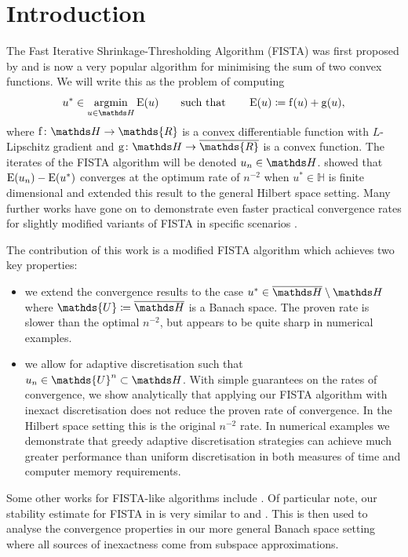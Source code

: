 \documentclass[10pt,a4paper,onecolumn]{article}
\numberwithin{equation}{section}
\let\F\mathds\let\C\mathcal\newcommand{\R}{\F{R}}\newcommand{\A}{\C{A}}
\newcommand{\op}[1]{\operatorname{#1}}\newcommand{\overtext}[2]{\stackrel{\text{#1}}{#2}}
\renewcommand{\bar}{\overline}\renewcommand{\hat}{\widehat}\renewcommand{\tilde}{\widetilde}
\DeclareMathOperator*{\argmin}{argmin}\DeclareMathOperator{\TV}{TV}
\newcommand*{\Func}[1]{%
	\IfEqCase{#1}{%
		{0}{\op{E}}%
		{1}{\op{F}}%
		{2}{\op{G}}%
		{3}{\op{H}}%
	}[\op{F}#1]%
}
\newcommand*{\func}[1]{%
	\IfEqCase{#1}{%
		{0}{\op{e}}%
		{1}{\op{f}}%
		{2}{\op{g}}%
		{3}{\op{h}}%
	}[\op{f}#1]%
}
\newcommand*{\varf}[1]{%
	\IfEqCase{#1}{%
		{0}{u}%
		{1}{v}%
		{2}{w}%
	}[u#1]%
}
\newcommand*{\spcf}[1]{%
	\IfEqCase{#1}{%
		{0}{\F{U}}%
		{1}{\F{V}}%
		{2}{\F{W}}%
	}[\F{U}#1]%
}
\begin{document}
\section{Introduction}
The Fast Iterative Shrinkage-Thresholding Algorithm (FISTA) was first proposed by \citet{Beck2009} and is now a very popular algorithm for minimising the sum of two convex functions. We will write this as the problem of computing 
\begin{equation}\label{eq: min F = fD+fC}
	u^* \in \argmin_{\varf0\in\F H}\Func0(\varf0)  \qquad\text{such that}\qquad \Func0(\varf0)\coloneqq \func1(\varf0) + \func2(\varf0),
\end{equation}
where $\func1\colon\F H\to\R$ is a convex differentiable function with $L$-Lipschitz gradient and $\func2\colon\F H\to\bar\R$ is a convex function. The iterates of the FISTA algorithm will be denoted $\varf0_n\in\F H$. \citet{Beck2009} showed that $\Func0(\varf0_n) - \Func0(\varf0^*)$ converges at the optimum rate of $n^{-2}$ when $u^*\in \F H$ is finite dimensional and \cite{Chambolle2015} extended this result to the general Hilbert space setting. Many further works have gone on to demonstrate even faster practical convergence rates for slightly modified variants of FISTA in specific scenarios \citep{some references}.

The contribution of this work is a modified FISTA algorithm which achieves two key properties:
\begin{itemize}
	\item we extend the convergence results to the case $\varf0^*\in\bar{\F H}\setminus\F H$ where $\spcf0\coloneqq \bar{\F H}$ is a Banach space. The proven rate is slower than the optimal $n^{-2}$, but appears to be quite sharp in numerical examples.
	\item we allow for adaptive discretisation such that $\varf0_n\in\spcf0^n\subset\F H$. With simple guarantees on the rates of convergence, we show analytically that applying our FISTA algorithm with inexact discretisation does not reduce the proven rate of convergence. In the Hilbert space setting this is the original $n^{-2}$ rate. In numerical examples we demonstrate that greedy adaptive discretisation strategies can achieve much greater performance than uniform discretisation in both measures of time and computer memory requirements.
\end{itemize}
 Some other works for FISTA-like algorithms include \citep{Jiang2012,Villa2013}. Of particular note, our stability estimate for FISTA  in  is very similar to \cite[Proposition 2]{Schmidt2011} and \cite[Proposition 3.3]{Aujol2015}. This is then used to analyse the convergence properties in our more general Banach space setting where all sources of inexactness come from subspace approximations.
\end{document}
